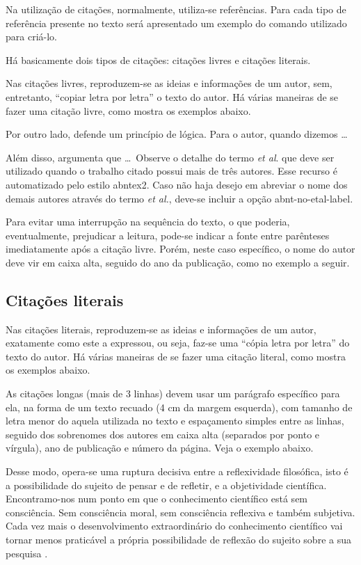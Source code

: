 Na utilização de citações, normalmente, utiliza-se referências.
Para cada tipo de referência presente no texto será apresentado um exemplo do comando utilizado para criá-lo.

Há basicamente dois tipos de citações: citações livres e citações literais.

Nas citações livres, reproduzem-se as ideias e informações de um autor, sem, entretanto, ``copiar letra por letra'' o texto do autor.
Há várias maneiras de se fazer uma citação livre, como mostra os exemplos abaixo.

Por outro lado, \textcite{maturana:2003} defende um princípio de lógica.
Para o autor, quando dizemos \ldots

Além disso, \textcite{teste:2004} argumenta que \ldots\mbox{ }Observe o detalhe do termo \textit{et al}.
que deve ser utilizado quando o trabalho citado possui mais de três autores.
Esse recurso é automatizado pelo estilo {\ttfamily abntex2}.
Caso não haja desejo em abreviar o nome dos demais autores através do termo \textit{et al.}, deve-se incluir a opção {\ttfamily abnt-no-etal-label}.

Para evitar uma interrupção na sequência do texto, o que poderia, eventualmente, prejudicar a leitura, pode-se indicar a fonte entre parênteses imediatamente após a citação livre.
Porém, neste caso específico, o nome do autor deve vir em caixa alta, seguido do ano da publicação, como no exemplo a seguir.

\cite{BibTeX2009}

\subsection{Citações literais}\label{citacoesLiterais}
Nas citações literais, reproduzem-se as ideias e informações de um autor, exatamente como este a expressou, ou seja, faz-se uma ``cópia letra por letra'' do texto do autor.
Há várias maneiras de se fazer uma citação literal, como mostra os exemplos abaixo.

As citações longas (mais de 3 linhas) devem usar um parágrafo específico para ela, na forma de um texto recuado (4 cm da margem esquerda), com tamanho de letra menor do aquela utilizada no texto e espaçamento simples entre as linhas, seguido dos sobrenomes dos autores em caixa alta (separados por ponto e vírgula), ano de publicação e número da página.
Veja o exemplo abaixo.

\begin{citacao}
Desse modo, opera-se uma ruptura decisiva entre a reflexividade filosófica, isto é a possibilidade do sujeito de pensar e de refletir, e a objetividade científica.
Encontramo-nos num ponto em que o conhecimento científico está sem consciência.
Sem consciência moral, sem consciência reflexiva e também subjetiva.
Cada vez mais o desenvolvimento extraordinário do conhecimento científico vai tornar menos praticável a própria possibilidade de reflexão do sujeito sobre a sua pesquisa \cite[p.28]{morinmoigne:2000}.
\end{citacao}

